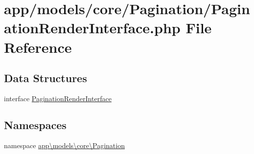 \hypertarget{_pagination_render_interface_8php}{\section{app/models/core/\-Pagination/\-Pagination\-Render\-Interface.php File Reference}
\label{_pagination_render_interface_8php}
}
\subsection*{Data Structures}
\begin{DoxyCompactItemize}
\item 
interface \hyperlink{interfaceapp_1_1models_1_1core_1_1_pagination_1_1_pagination_render_interface}{Pagination\-Render\-Interface}
\end{DoxyCompactItemize}
\subsection*{Namespaces}
\begin{DoxyCompactItemize}
\item 
namespace \hyperlink{namespaceapp_1_1models_1_1core_1_1_pagination}{app\textbackslash{}models\textbackslash{}core\textbackslash{}\-Pagination}
\end{DoxyCompactItemize}
